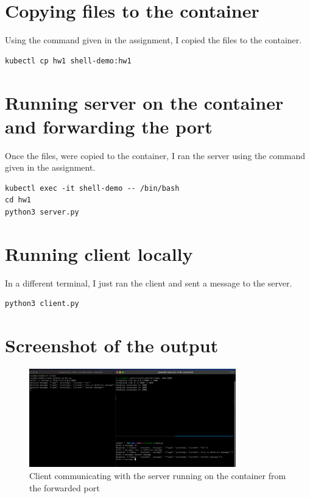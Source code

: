 \documentclass{article}
\begin{document}
\section*{Copying files to the container}

Using the command given in the assignment, I copied the files to the container.


\begin{lstlisting}
kubectl cp hw1 shell-demo:hw1
\end{lstlisting}




\section*{Running server on the container and forwarding the port}

Once the files, were copied to the container, I ran the server using the command given in the assignment.

\begin{lstlisting}
kubectl exec -it shell-demo -- /bin/bash
cd hw1
python3 server.py
\end{lstlisting}

\section*{Running client locally}

In a different terminal, I just ran the client and sent a message to the server.

\begin{lstlisting}
python3 client.py
\end{lstlisting}

\section*{Screenshot of the output}

\begin{figure}[ht]
    \centering
    \includegraphics[width=0.8\textwidth]{output.png}
    \caption{Client communicating with the server running on the container from the forwarded port}
\end{figure}
\end{document}
